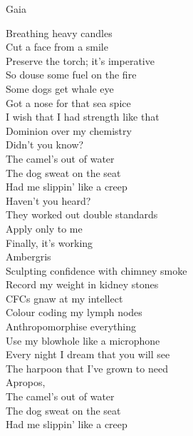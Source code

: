 Gaia \\




Breathing heavy candles \\
Cut a face from a smile \\
Preserve the torch; it's imperative \\
So douse some fuel on the fire \\

Some dogs get whale eye \\
Got a nose for that sea spice \\
I wish that I had strength like that \\
Dominion over my chemistry \\

Didn't you know? \\
The camel's out of water \\
The dog sweat on the seat \\
Had me slippin' like a creep \\

Haven't you heard? \\
They worked out double standards \\
Apply only to me \\
Finally, it's working \\
Ambergris \\

Sculpting confidence with chimney smoke \\
Record my weight in kidney stones \\
CFCs gnaw at my intellect \\
Colour coding my lymph nodes \\

Anthropomorphise everything \\
Use my blowhole like a microphone \\
Every night I dream that you will see \\
The harpoon that I've grown to need \\

Apropos, \\
The camel's out of water \\
The dog sweat on the seat \\
Had me slippin' like a creep \\

